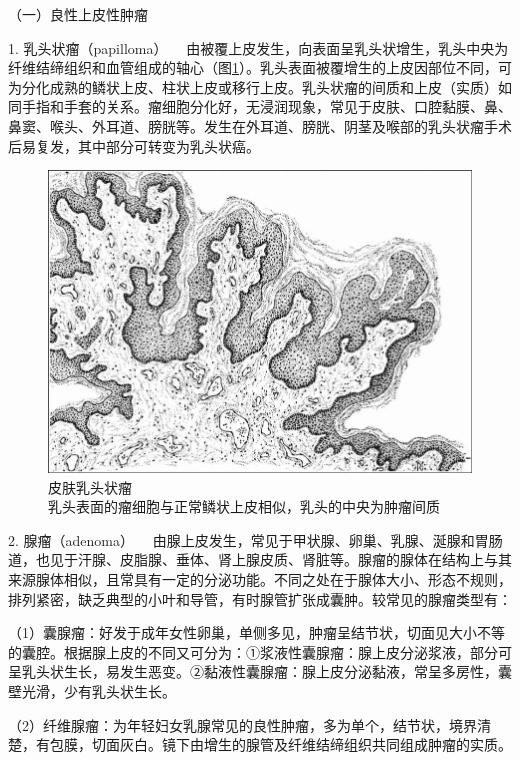 {（一）良性上皮性肿瘤}

{1. 乳头状瘤（papilloma）}
　由被覆上皮发生，向表面呈乳头状增生，乳头中央为纤维结缔组织和血管组成的轴心（图\ref{fig5-13}）。乳头表面被覆增生的上皮因部位不同，可为分化成熟的鳞状上皮、柱状上皮或移行上皮。乳头状瘤的间质和上皮（实质）如同手指和手套的关系。瘤细胞分化好，无浸润现象，常见于皮肤、口腔黏膜、鼻、鼻窦、喉头、外耳道、膀胱等。发生在外耳道、膀胱、阴茎及喉部的乳头状瘤手术后易复发，其中部分可转变为乳头状癌。

\begin{figure}[!htbp]
 \centering
 \includegraphics{./images/Image00081.jpg}
 \caption{皮肤乳头状瘤\\{\small 乳头表面的瘤细胞与正常鳞状上皮相似，乳头的中央为肿瘤间质}}
 \label{fig5-13}
  \end{figure}



{2. 腺瘤（adenoma）}
　由腺上皮发生，常见于甲状腺、卵巢、乳腺、涎腺和胃肠道，也见于汗腺、皮脂腺、垂体、肾上腺皮质、肾脏等。腺瘤的腺体在结构上与其来源腺体相似，且常具有一定的分泌功能。不同之处在于腺体大小、形态不规则，排列紧密，缺乏典型的小叶和导管，有时腺管扩张成囊肿。较常见的腺瘤类型有：

（1）囊腺瘤：好发于成年女性卵巢，单侧多见，肿瘤呈结节状，切面见大小不等的囊腔。根据腺上皮的不同又可分为：①浆液性囊腺瘤：腺上皮分泌浆液，部分可呈乳头状生长，易发生恶变。②黏液性囊腺瘤：腺上皮分泌黏液，常呈多房性，囊壁光滑，少有乳头状生长。

（2）纤维腺瘤：为年轻妇女乳腺常见的良性肿瘤，多为单个，结节状，境界清楚，有包膜，切面灰白。镜下由增生的腺管及纤维结缔组织共同组成肿瘤的实质。

